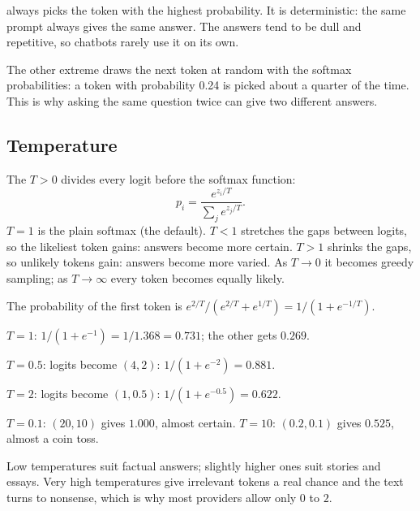\begin{definition}
 always picks the token with the highest probability. It is deterministic: the same prompt always gives the same answer. The answers tend to be dull and repetitive, so chatbots rarely use it on its own.
\end{definition}

\begin{remark}
The other extreme draws the next token at random with the softmax probabilities: a token with probability 0.24 is picked about a quarter of the time. This is why asking the same question twice can give two different answers.
\end{remark}

\subsection*{Temperature}

\begin{definition}[Temperature]
The  $T > 0$ divides every logit before the softmax function:
\[
p_i = \frac{e^{z_i/T}}{\sum_j e^{z_j/T}}.
\]
$T = 1$ is the plain softmax (the default). $T < 1$ stretches the gaps between logits, so the likeliest token gains: answers become more certain. $T > 1$ shrinks the gaps, so unlikely tokens gain: answers become more varied. As $T \to 0$ it becomes greedy sampling; as $T \to \infty$ every token becomes equally likely.
\end{definition}

\begin{example}
The probability of the first token is $e^{2/T}/(e^{2/T} + e^{1/T}) = 1/(1 + e^{-1/T})$.
\begin{steps}
  \item $T = 1$: $1/(1 + e^{-1}) = 1/1.368 = 0.731$; the other gets $0.269$.
  \item $T = 0.5$: logits become $(4, 2)$: $1/(1 + e^{-2}) = 0.881$.
  \item $T = 2$: logits become $(1, 0.5)$: $1/(1 + e^{-0.5}) = 0.622$.
  \item $T = 0.1$: $(20, 10)$ gives $1.000$, almost certain. $T = 10$: $(0.2, 0.1)$ gives $0.525$, almost a coin toss.
\end{steps}
\end{example}

\begin{remark}[Choosing $T$]
Low temperatures suit factual answers; slightly higher ones suit stories and essays. Very high temperatures give irrelevant tokens a real chance and the text turns to nonsense, which is why most providers allow only $0$ to $2$.
\end{remark}

